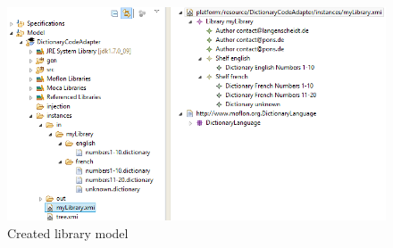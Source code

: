 \begin{figure}[htp]
\begin{center}
  \includegraphics[width=\textwidth]{pics/moca/3MocaTreeToModel/tree_to_model_filesystem.png}
  \caption{Created library model}
  \label{fig:moca-created-libary}
\end{center}
\end{figure}